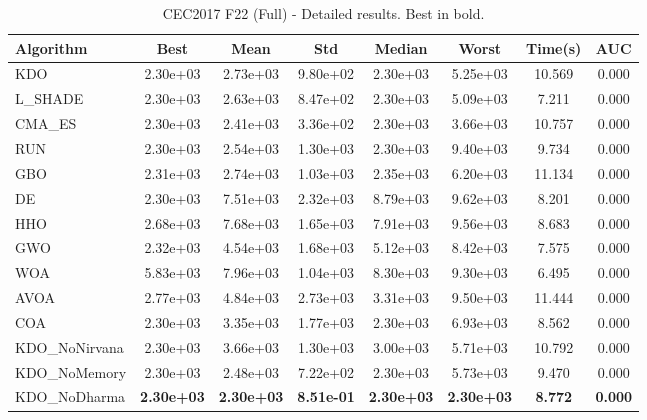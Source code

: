 \begin{table}[H]
\centering\small
\caption{CEC2017 F22 (Full) - Detailed results. Best in bold.}
\label{tab:cec2017_F22}
\begin{tabular}{lccccccc}
\toprule
\textbf{Algorithm} & \textbf{Best} & \textbf{Mean} & \textbf{Std} & \textbf{Median} & \textbf{Worst} & \textbf{Time(s)} & \textbf{AUC} \\
\midrule
KDO & 2.30e+03 & 2.73e+03 & 9.80e+02 & 2.30e+03 & 5.25e+03 & 10.569 & 0.000 \\
L_SHADE & 2.30e+03 & 2.63e+03 & 8.47e+02 & 2.30e+03 & 5.09e+03 & 7.211 & 0.000 \\
CMA_ES & 2.30e+03 & 2.41e+03 & 3.36e+02 & 2.30e+03 & 3.66e+03 & 10.757 & 0.000 \\
RUN & 2.30e+03 & 2.54e+03 & 1.30e+03 & 2.30e+03 & 9.40e+03 & 9.734 & 0.000 \\
GBO & 2.31e+03 & 2.74e+03 & 1.03e+03 & 2.35e+03 & 6.20e+03 & 11.134 & 0.000 \\
DE & 2.30e+03 & 7.51e+03 & 2.32e+03 & 8.79e+03 & 9.62e+03 & 8.201 & 0.000 \\
HHO & 2.68e+03 & 7.68e+03 & 1.65e+03 & 7.91e+03 & 9.56e+03 & 8.683 & 0.000 \\
GWO & 2.32e+03 & 4.54e+03 & 1.68e+03 & 5.12e+03 & 8.42e+03 & 7.575 & 0.000 \\
WOA & 5.83e+03 & 7.96e+03 & 1.04e+03 & 8.30e+03 & 9.30e+03 & 6.495 & 0.000 \\
AVOA & 2.77e+03 & 4.84e+03 & 2.73e+03 & 3.31e+03 & 9.50e+03 & 11.444 & 0.000 \\
COA & 2.30e+03 & 3.35e+03 & 1.77e+03 & 2.30e+03 & 6.93e+03 & 8.562 & 0.000 \\
KDO_NoNirvana & 2.30e+03 & 3.66e+03 & 1.30e+03 & 3.00e+03 & 5.71e+03 & 10.792 & 0.000 \\
KDO_NoMemory & 2.30e+03 & 2.48e+03 & 7.22e+02 & 2.30e+03 & 5.73e+03 & 9.470 & 0.000 \\
KDO_NoDharma & \textbf{2.30e+03} & \textbf{2.30e+03} & \textbf{8.51e-01} & \textbf{2.30e+03} & \textbf{2.30e+03} & \textbf{8.772} & \textbf{0.000} \\
\bottomrule
\end{tabular}
\end{table}
